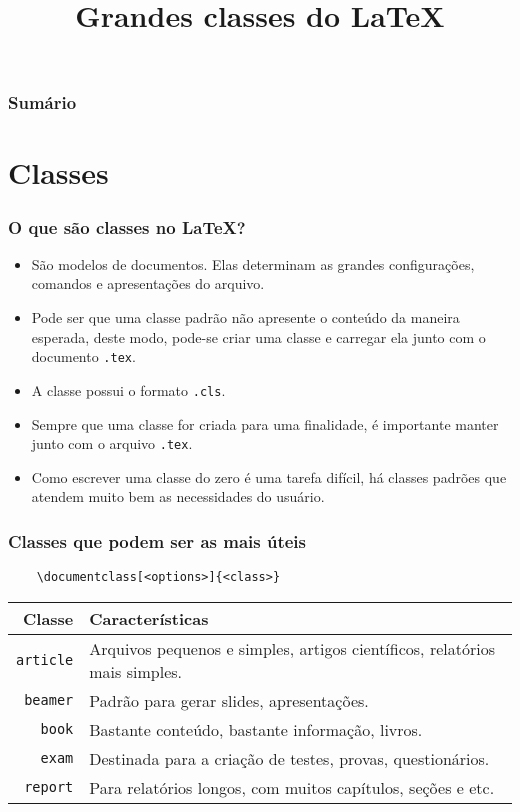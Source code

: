 \documentclass[brazilian]{beamer}
\title{Grandes classes do \LaTeX}
\begin{document}
\frame{\titlepage}

\begin{frame}
    \frametitle{Sumário}
    \tableofcontents
\end{frame}

\section{Classes}

\begin{frame}[fragile]
    \frametitle{O que são classes no \LaTeX?}
    
    \begin{itemize}
        \item São modelos de documentos. Elas determinam as grandes configurações, comandos e apresentações do arquivo.
        \item Pode ser que uma classe padrão não apresente o conteúdo da maneira esperada, deste modo, pode-se criar uma classe e carregar ela junto com o documento \lstinline[]!.tex!.
        \item A classe possui o formato \lstinline[]!.cls!.
        \item Sempre que uma classe for criada para uma finalidade, é importante manter junto com o arquivo \lstinline[]!.tex!.
        \item Como escrever uma classe do zero é uma tarefa difícil, há classes padrões que atendem muito bem as necessidades do usuário.
    \end{itemize}
    
\end{frame}

\begin{frame}[fragile]
    \frametitle{Classes que podem ser as mais úteis}
    \begin{lstlisting}
    \documentclass[<options>]{<class>}
\end{lstlisting}
    \begin{tabularx}{\textwidth}{rX}
        \hline
        \textbf{Classe}        & \textbf{Características}                                                   \\ \hline
        \lstinline[style=myStyleLatex]!article! & Arquivos pequenos e simples, artigos científicos, relatórios mais simples. \\ \hline
        \lstinline[style=myStyleLatex]!beamer! & Padrão para gerar slides, apresentações.                                   \\ \hline
        \lstinline[style=myStyleLatex]!book! & Bastante conteúdo, bastante informação, livros.                            \\ \hline
        \lstinline[style=myStyleLatex]!exam! & Destinada para a criação de testes, provas, questionários.                 \\ \hline
        \lstinline[style=myStyleLatex]!report! & Para relatórios longos, com muitos capítulos, seções e etc.                \\ \hline
    \end{tabularx}
\end{frame}
\end{document}
